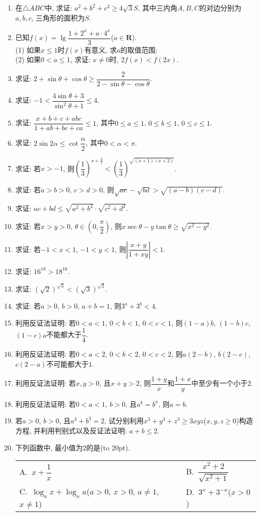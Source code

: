 \documentclass[10pt,a4paper]{article}
\newcommand{\bracket}[1]{(\hbox to #1pt{})}
\newcommand{\twoch}[4]{\par\begin{tabular}{p{.46\textwidth}p{.46\textwidth}}
A.~#1& B.~#2\\
C.~#3& D.~#4
\end{tabular}}
\begin{document}
\begin{enumerate}[1.]
\item 在$\triangle ABC$中, 求证: $a^2+b^2+c^2\ge 4\sqrt 3S$, 其中三内角$A,B,C$的对边分别为$a,b,c$, 三角形的面积为$S$.
\item 已知$f(x)=\lg \dfrac{1+2^x+a\cdot 4^x}3$($a\in \mathbf{R}$).\\
(1) 如果$x\le 1$时$f(x)$有意义, 求$a$的取值范围;\\
(2) 如果$0<a\le 1$, 求证: $x\ne 0$时, $2f(x)<f(2x)$.
\item 求证: $2+\sin \theta +\cos \theta \ge \dfrac 2{2-\sin \theta -\cos \theta }$.
\item 求证: $-1<\dfrac{4\sin \theta +3}{\sin^2\theta+1}\le 4$.
\item 求证: $\dfrac{x+b+c+abc}{1+ab+bc+ca}\le 1$, 其中$0\le a\le 1$, $0\le b\le 1$, $0\le c\le 1$.
\item 求证: $2\sin 2\alpha \le \cot \dfrac{\alpha}2$, 其中$0<\alpha <\pi$.
\item 求证: 若$x>-1$, 则$(\dfrac 13)^{x+\frac 32}<(\dfrac 13)^{\sqrt{(x+1)(x+2)}}$.
\item 求证: 若$a>b>0$, $c>d>0$, 则$\sqrt{ac}-\sqrt{bd}>\sqrt{(a-b)(c-d)}$.
\item 求证: $ac+bd\le \sqrt{a^2+b^2}\cdot \sqrt{c^2+d^2}$.
\item 求证: 若$x>y>0$, $\theta \in (0,\dfrac{\pi}2)$, 则$x\sec \theta -y\tan \theta \ge \sqrt{x^2-y^2}$.
\item 求证: 若$-1<x<1$, $-1<y<1$, 则$|\dfrac{x+y}{1+xy}|<1$.
\item 求证: $16^{18}>18^{16}$.
\item 求证: $(\sqrt 2)^{\sqrt 3}<(\sqrt 3)^{\sqrt 2}$.
\item 求证: 若$a>0$, $b>0$, $a+b=1$, 则$3^a+3^b<4$.
\item 利用反证法证明: 若$0<a<1$, $0<b<1$, $0<c<1$, 则$(1-a)b$, $(1-b)c$, $(1-c)a$不能都大于$\dfrac 14$.
\item 利用反证法证明: 若$0<a<2$, $0<b<2$, $0<c<2$, 则$a(2-b)$, $b(2-c)$, $c(2-a)$不可能都大于$1$.
\item 利用反证法证明: 若$x,y>0$, 且$x+y>2$, 则$\dfrac{1+y}x$和$\dfrac{1+x}y$中至少有一个小于$2$.
\item 利用反证法证明: 若$0<a<1$, $b>0$, 且$a^b=b^a$, 则$a=b$.
\item 若$a>0$, $b>0$, 且$a^3+b^3=2$, 试分别利用$x^3+y^3+z^3\ge 3xyz$($x,y,z\ge 0$)构造方程, 并利用判别式以及反证法证明: $a+b\le 2$.
\item 下列函数中, 最小值为$2$的是\bracket{20}.
\twoch{$x+\dfrac 1x$}{$\dfrac{x^2+2}{\sqrt{x^2+1}}$}{$\log_ax+\log_xa$($a>0$, $x>0$, $a\ne 1$, $x\ne 1$)}{$3^x+3^{-x}$($x>0$)}

\end{enumerate}
\end{document}
